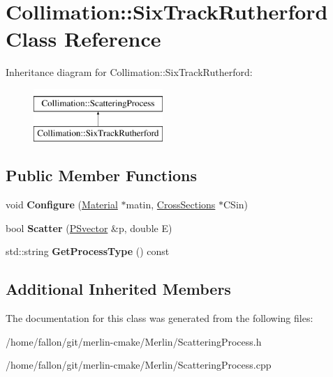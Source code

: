 \hypertarget{classCollimation_1_1SixTrackRutherford}{}\section{Collimation\+:\+:Six\+Track\+Rutherford Class Reference}
\label{classCollimation_1_1SixTrackRutherford}
Inheritance diagram for Collimation\+:\+:Six\+Track\+Rutherford\+:\begin{figure}[H]
\begin{center}
\leavevmode
\includegraphics[height=2.000000cm]{classCollimation_1_1SixTrackRutherford}
\end{center}
\end{figure}
\subsection*{Public Member Functions}
\begin{DoxyCompactItemize}
\item 
\mbox{\label{classCollimation_1_1SixTrackRutherford_a2e909c3048765b3cdd0084aaa772ba87}} 
void {\bfseries Configure} (\hyperlink{classMaterial}{Material} $\ast$matin, \hyperlink{classCollimation_1_1CrossSections}{Cross\+Sections} $\ast$C\+Sin)
\item 
\mbox{\label{classCollimation_1_1SixTrackRutherford_a1cb4f72cdfd2465dd54d6eba2e585986}} 
bool {\bfseries Scatter} (\hyperlink{classPSvector}{P\+Svector} \&p, double E)
\item 
\mbox{\label{classCollimation_1_1SixTrackRutherford_a99bc1c6df672a0c59b0823e1d77804fa}} 
std\+::string {\bfseries Get\+Process\+Type} () const
\end{DoxyCompactItemize}
\subsection*{Additional Inherited Members}


The documentation for this class was generated from the following files\+:\begin{DoxyCompactItemize}
\item 
/home/fallon/git/merlin-\/cmake/\+Merlin/Scattering\+Process.\+h\item 
/home/fallon/git/merlin-\/cmake/\+Merlin/Scattering\+Process.\+cpp\end{DoxyCompactItemize}
